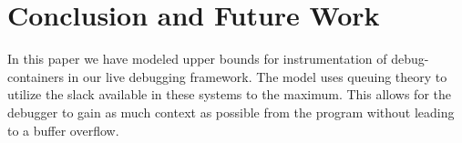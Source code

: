 \section{Conclusion and Future Work}
\label{sec:conclusion}

In this paper we have modeled upper bounds for instrumentation of debug-containers in our live debugging framework.
The model uses queuing theory to utilize the slack available in these systems to the maximum.
This allows for the debugger to gain as much context as possible from the program without leading to a buffer overflow.